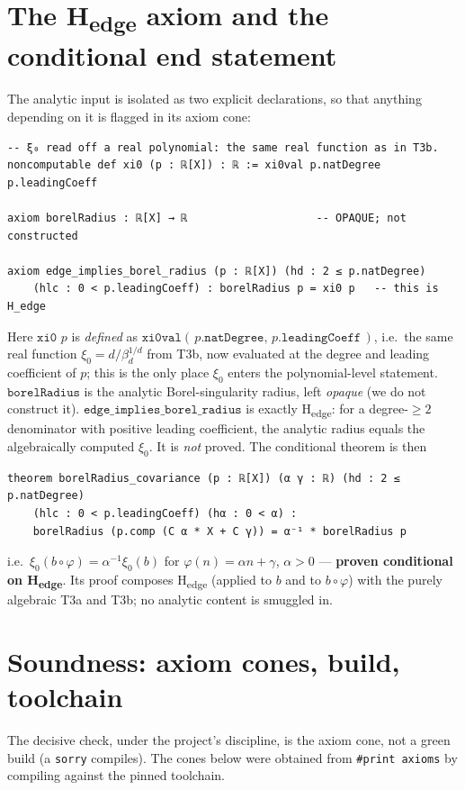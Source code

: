 \documentclass[11pt]{article}
\newcommand{\xizero}{\xi_{0}}
\newcommand{\Hedge}{\textsf{H\textsubscript{edge}}}
\begin{document}
\section{The \Hedge{} axiom and the conditional end statement}

The analytic input is isolated as two explicit declarations, so that anything
depending on it is flagged in its axiom cone:
\begin{lstlisting}
-- ξ₀ read off a real polynomial: the same real function as in T3b.
noncomputable def xi0 (p : ℝ[X]) : ℝ := xi0val p.natDegree p.leadingCoeff

axiom borelRadius : ℝ[X] → ℝ                    -- OPAQUE; not constructed

axiom edge_implies_borel_radius (p : ℝ[X]) (hd : 2 ≤ p.natDegree)
    (hlc : 0 < p.leadingCoeff) : borelRadius p = xi0 p   -- this is H_edge
\end{lstlisting}
Here $\texttt{xi0 } p$ is \emph{defined} as
$\texttt{xi0val}(\,p.\texttt{natDegree},\,p.\texttt{leadingCoeff}\,)$, i.e.\ the
same real function $\xizero=d/\beta_d^{1/d}$ from T3b, now evaluated at the
degree and leading coefficient of $p$; this is the only place $\xizero$ enters
the polynomial-level statement. $\texttt{borelRadius}$ is the analytic
Borel-singularity radius, left \emph{opaque} (we do not construct it).
$\texttt{edge\_implies\_borel\_radius}$ is exactly \Hedge: for a degree-$\ge2$
denominator with positive leading coefficient, the analytic radius equals the
algebraically computed $\xizero$. It is \emph{not} proved. The conditional
theorem is then
\begin{lstlisting}
theorem borelRadius_covariance (p : ℝ[X]) (α γ : ℝ) (hd : 2 ≤ p.natDegree)
    (hlc : 0 < p.leadingCoeff) (hα : 0 < α) :
    borelRadius (p.comp (C α * X + C γ)) = α⁻¹ * borelRadius p
\end{lstlisting}
i.e.\ $\xizero(b\circ\varphi)=\alpha^{-1}\xizero(b)$ for $\varphi(n)=\alpha n+\gamma$,
$\alpha>0$ --- \textbf{proven conditional on \Hedge}. Its proof composes
\Hedge{} (applied to $b$ and to $b\circ\varphi$) with the purely algebraic T3a
and T3b; no analytic content is smuggled in.

\section{Soundness: axiom cones, build, toolchain}

The decisive check, under the project's discipline, is the axiom cone, not a
green build (a \texttt{sorry} compiles). The cones below were obtained from
\texttt{\#print axioms} by compiling against the pinned toolchain.
\end{document}
